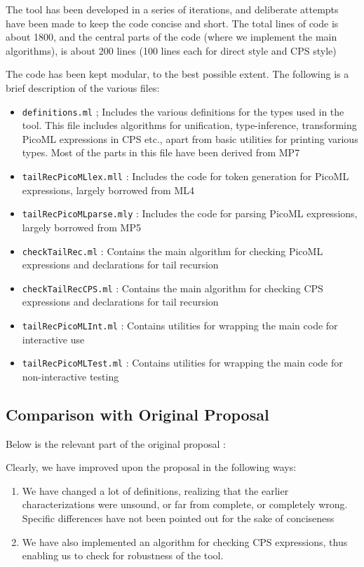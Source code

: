 The tool \tool has been developed in a series of iterations, and deliberate attempts have been made to keep
the code concise and short.
The total lines of code is about 1800, and the central parts of the code (where we implement the main algorithms), is about 200 lines (100 lines each for direct style and CPS style)

The code has been kept modular, to the best possible extent.
The following is a brief description of the various files:
\begin{itemize}
 \item \texttt{definitions.ml} ; Includes the various definitions for the types used in the tool. 
 This file includes algorithms for unification, type-inference, transforming PicoML expressions in CPS etc., apart from basic utilities for printing various types.
 Most of the parts in this file have been derived from MP7
 \item \texttt{tailRecPicoMLlex.mll} : Includes the code for token generation for PicoML expressions, largely borrowed from ML4
 \item \texttt{tailRecPicoMLparse.mly} : Includes the code for parsing PicoML expressions, largely borrowed from MP5
 \item \texttt{checkTailRec.ml} : Contains the main algorithm for checking PicoML expressions and declarations for tail recursion
 \item \texttt{checkTailRecCPS.ml} : Contains the main algorithm for checking CPS expressions and declarations for tail recursion
 \item \texttt{tailRecPicoMLInt.ml} : Contains utilities for wrapping the main code for interactive use
 \item \texttt{tailRecPicoMLTest.ml} : Contains utilities for wrapping the main code for non-interactive testing
\end{itemize}

\subsection{Comparison with Original Proposal}

Below is the relevant part of the original proposal :



Clearly, we have improved upon the proposal in the following ways: 

\begin{enumerate}
 \item We have changed a lot of definitions, realizing that the earlier characterizations were unsound, or far from complete, or completely wrong.
 Specific differences have not been pointed out for the sake of conciseness
 \item We have also implemented an algorithm for checking CPS expressions, thus enabling us to check for robustness of the tool.
\end{enumerate}
